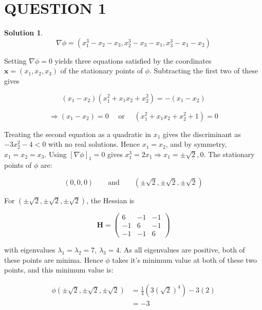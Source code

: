 \documentclass[a4paper]{article}
\newtheorem*{soln}{Solution}
\begin{document}
	
\maketitle

\section{QUESTION 1}

\begin{soln}
\[ \nabla \phi = (x_{1}^{3} - x_{2} - x_{3}, x_{2}^{3} - x_{3} - x_{1}, x_{3}^{3} - x_{1} - x_{2}) \]
\end{soln}

Setting $ \nabla \phi = 0 $ yields three equations satisfied by the coordinates $ \mathbf{x} = (x_{1},x_{2},x_{3}) $ of the stationary points of $ \phi $. Subtracting the first two of these gives

\[ (x_{1} - x_{2})(x_{1}^{2} + x_{1}x_{2} + x_{2}^{2}) = -(x_{1}-x_{2}) \]

\[ \Rightarrow (x_{1} - x_{2}) = 0 \quad \text{ or } \quad (x_{1}^{2} + x_{1}x_{2} + x_{2}^{2} + 1) = 0  \]

Treating the second equation as a quadratic in $ x_{1} $ gives the discriminant as $ -3x_{2}^{2} - 4  < 0 $ with no real solutions. Hence $ x_{1} = x_{2} $, and by symmetry, $ x_{1} = x_{2} = x_{3} $. Using  $ [\nabla \phi]_{1} = 0 $ gives $ x_{1}^{3} = 2 x_{1}  \Rightarrow x_{1} = \pm \sqrt{2}, 0 $. The stationary points of $ \phi $ are:

\[ (0,0,0) \qquad \text{and} \qquad (\pm \sqrt{2},\pm \sqrt{2},\pm \sqrt{2}) \]


For $ (\pm \sqrt{2},\pm \sqrt{2},\pm \sqrt{2}) $, the Hessian is 

\[ \mathbf{H} = \begin{pmatrix}
6 & -1 & -1 \\
-1 & 6 & -1 \\
-1 & -1 & 6 
\end{pmatrix} \]

with eigenvalues $ \lambda_{1} = \lambda_{2} = 7 $, $ \lambda_{3} = 4 $.
As all eigenvalues are positive, both of these points are minima. Hence $ \phi $ takes it's minimum value at both of these two points, and this minimum value is:

\begin{align*}
\phi (\pm \sqrt{2},\pm \sqrt{2},\pm \sqrt{2}) & = \frac{1}{4}( 3  (\sqrt{2})^{4} ) - 3(2)\\
& = -3
\end{align*}
\end{document}
